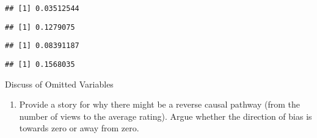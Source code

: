 \documentclass[
]{article}
\newenvironment{Shaded}{\begin{snugshade}}{\end{snugshade}}
\newcommand{\FunctionTok}[1]{\textcolor[rgb]{0.00,0.00,0.00}{#1}}
\newcommand{\NormalTok}[1]{#1}
\newcommand{\OtherTok}[1]{\textcolor[rgb]{0.56,0.35,0.01}{#1}}
\newcommand{\SpecialCharTok}[1]{\textcolor[rgb]{0.00,0.00,0.00}{#1}}
\providecommand{\tightlist}{%
  \setlength{\itemsep}{0pt}\setlength{\parskip}{0pt}}
\begin{document}
\begin{verbatim}
## [1] 0.03512544
\end{verbatim}

\begin{Shaded}
\end{Shaded}

\begin{verbatim}
## [1] 0.1279075
\end{verbatim}

\begin{Shaded}
\end{Shaded}

\begin{verbatim}
## [1] 0.08391187
\end{verbatim}

\begin{Shaded}
\end{Shaded}

\begin{verbatim}
## [1] 0.1568035
\end{verbatim}

Discuss of Omitted Variables

\begin{enumerate}
\def\labelenumi{\alph{enumi}.}
\setcounter{enumi}{1}
\tightlist
\item
  Provide a story for why there might be a reverse causal pathway (from
  the number of views to the average rating). Argue whether the
  direction of bias is towards zero or away from zero.
\end{enumerate}

\begin{Shaded}
\end{Shaded}
\end{document}
